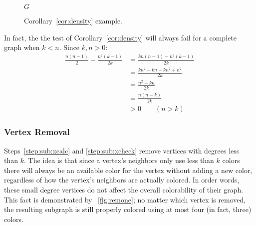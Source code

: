 \begin{figure}[H]
  \centering

  \(G\)
  \caption{Corollary~\ref{cor:density} example.}
  \label{fig:density}
\end{figure}

In fact, the the test of Corollary~\ref{cor:density} will always fail for a complete graph when \(k<n\).  Since
\(k,n>0\):
\begin{align*}
  \frac{n(n-1)}{2}-\frac{n^2(k-1)}{2k} &= \frac{kn(n-1)-n^2(k-1)}{2k} \\
  &= \frac{kn^2-kn-kn^2+n^2}{2k} \\
  &= \frac{n^2-kn}{2k} \\
  &= \frac{n(n-k)}{2k} \\
  &>0\qquad(n>k)
\end{align*}

\subsubsection{Vertex Removal}\label{sec:sub:sub:vertex}

Steps~\ref{step:sub:xcalc} and \ref{step:sub:xcheck} remove vertices with degrees less than \(k\).  The idea is
that since a vertex's neighbors only use less than \(k\) colors there will always be an available color for the
vertex without adding a new color, regardless of how the vertex's neighbors are actually colored.  In order words,
these small degree vertices do not affect the overall colorability of their graph.  This fact is demonstrated by
\figurename~\ref{fig:remone}; no matter which vertex is removed, the resulting subgraph is still properly colored
using at most four (in fact, three) colors.


